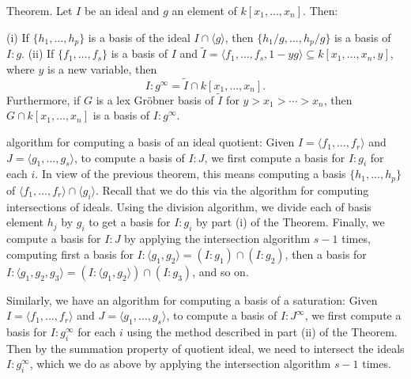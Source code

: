Theorem. Let \( I \) be an ideal and \( g \) an element of \( k[x_1, \ldots, x_n] \). Then:

(i) If \(\{h_1, \ldots, h_p\}\) is a basis of the ideal \( I \cap \langle g \rangle \), then \(\{h_1 / g, \ldots, h_p / g\}\) is a basis of \( I : g \).
(ii) If \(\{f_1, \ldots, f_s\}\) is a basis of \( I \) and \( \tilde{I} = \langle f_1, \ldots, f_s, 1 - yg \rangle \subseteq k[x_1, \ldots, x_n, y] \), where \( y \) is a new variable, then
\[
I : g^{\infty} = \tilde{I} \cap k[x_1, \ldots, x_n].
\]
Furthermore, if \( G \) is a lex Gröbner basis of \( \tilde{I} \) for \( y > x_1 > \cdots > x_n \), then \( G \cap k[x_1, \ldots, x_n] \) is a basis of \( I : g^{\infty} \).

algorithm for computing a basis of an ideal quotient: 
Given \( I = \langle f_1, \ldots, f_r \rangle \) and \( J = \langle g_1, \ldots, g_s \rangle \), to compute a basis of \( I : J \), 
we first compute a basis for \( I : g_i \) for each \( i \). 
In view of the previous theorem, this means computing a basis \( \{h_1, \ldots, h_p\} \) of 
\( \langle f_1, \ldots, f_r \rangle \cap \langle g_i \rangle \). 
Recall that we do this via the algorithm for computing intersections of ideals. 
Using the division algorithm, we divide each of basis element \( h_j \) by \( g_i \) to get a basis for \( I : g_i \) by part (i) of the Theorem. 
Finally, we compute a basis for \( I : J \) by applying the intersection algorithm \( s-1 \) times, computing first a basis for 
\( I : \langle g_1, g_2 \rangle = (I : g_1) \cap (I : g_2) \), 
then a basis for \( I : \langle g_1, g_2, g_3 \rangle = (I : \langle g_1, g_2 \rangle) \cap (I : g_3) \), and so on.

Similarly, we have an algorithm for computing a basis of a saturation: 
Given \( I = \langle f_1, \ldots, f_r \rangle \) and \( J = \langle g_1, \ldots, g_s \rangle \), 
to compute a basis of \( I : J^\infty \), we first compute a basis for \( I : g_i^\infty \) for each \( i \) 
using the method described in part (ii) of the Theorem. Then by the summation property of quotient ideal, 
we need to intersect the ideals \( I : g_i^\infty \), which we do as above by applying the intersection algorithm \( s-1 \) times.

